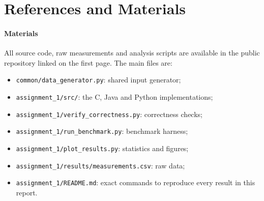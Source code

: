 \documentclass[conference,a4paper]{IEEEtran}
\newcommand{\code}[1]{\texttt{#1}}
\begin{document}
\section*{References and Materials}

\paragraph{Materials} All source code, raw measurements and analysis scripts
are available in the public repository linked on the first page. The
main files are:
\begin{itemize}[itemsep=0pt, topsep=2pt, leftmargin=1.2em]
  \item \code{common/data\_generator.py}: shared input generator;
  \item \code{assignment\_1/src/}: the C, Java and Python implementations;
  \item \code{assignment\_1/verify\_correctness.py}: correctness checks;
  \item \code{assignment\_1/run\_benchmark.py}: benchmark harness;
  \item \code{assignment\_1/plot\_results.py}: statistics and figures;
  \item \code{assignment\_1/results/measurements.csv}: raw data;
  \item \code{assignment\_1/README.md}: exact commands to reproduce every
        result in this report.
\end{itemize}

\clearpage
\end{document}
